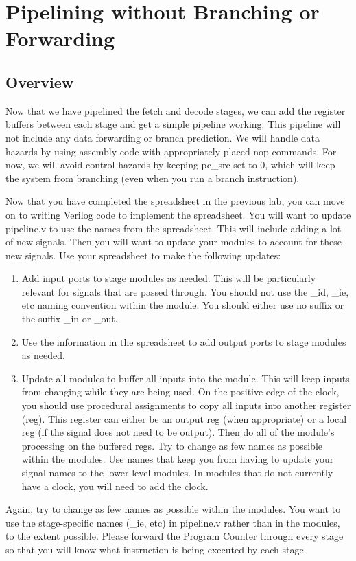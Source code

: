 \chapter{Pipelining without Branching or Forwarding}


\section{Overview}
Now that we have pipelined the fetch and decode stages, we can add the register buffers between each stage and get a simple pipeline working.  This pipeline will not include any data forwarding or branch prediction.  We will handle data hazards by using assembly code with appropriately placed nop commands.  For now, we will avoid control hazards by keeping pc\_src set to 0, which will keep the system from branching (even when you run a branch instruction).  

Now that you have completed the spreadsheet in the previous lab, you can move on to writing Verilog code to implement the spreadsheet.  You will want to update pipeline.v to use the names from the spreadsheet.  This will include adding a lot of new signals.  Then you will want to update your modules to account for these new signals.  Use your spreadsheet to make the following updates:
\begin{enumerate}
	\item Add input ports to stage modules as needed.  This will be particularly relevant for signals that are passed through.  You should not use the \_id, \_ie, etc naming convention within the module.  You should either use no suffix or the suffix \_in or \_out.
	\item Use the information in the spreadsheet to add output ports to stage modules as needed. 	
	\item Update all modules to buffer all inputs into the module.  This will keep inputs from changing while they are being used.  On the positive edge of the clock, you should use procedural assignments to copy all inputs into another register (reg).  This register can either be an output reg (when appropriate) or a local reg (if the signal does not need to be output).  Then do all of the module's processing on the buffered regs.  Try to change as few names as possible within the modules.  Use names that keep you from having to update your signal names to the lower level modules.  In modules that do not currently have a clock, you will need to add the clock.
\end{enumerate}
Again, try to change as few names as possible within the modules.  You want to use the stage-specific names (\_ie, etc) in pipeline.v rather than in the modules, to the extent possible.  Please forward the Program Counter through every stage so that you will know what instruction is being executed by each stage.

